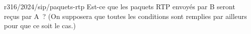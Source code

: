 \begin{question}{r316/2024/sip/paquets-rtp}
  Est-ce que les paquets RTP envoyés par B seront reçus par A~? (On
  supposera que toutes les conditions sont remplies par ailleurs
  pour que ce soit le cas.)
  \begin{reponses}
  \end{reponses}
\end{question}